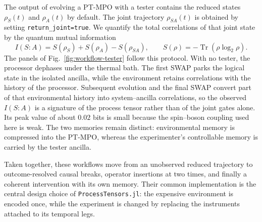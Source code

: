 The output of evolving a PT-MPO with a tester contains the reduced states $\rho_S(t)$ and $\rho_A(t)$ by default. 
The joint trajectory $\rho_{SA}(t)$ is obtained by setting \texttt{return\_joint=true}. 
We quantify the total correlations of that joint state by the quantum mutual information
%
\begin{equation}
    I(S{:}A)
    =S(\rho_S)+S(\rho_A)-S(\rho_{SA}),
    \qquad
    S(\rho)=-\operatorname{Tr}\!\left(\rho\log_2\rho\right).
    \label{eq:tester-mutual-information}
\end{equation}
%
The panels of Fig.~\ref{fig:workflow-tester} follow this protocol. 
With no tester, the processor dephases under the thermal bath. 
The first SWAP parks the logical state in the isolated ancilla, while the environment retains correlations with the history of the processor. 
Subsequent evolution and the final SWAP convert part of that environmental history into system--ancilla correlations, so the observed $I(S{:}A)$ is a signature of the process tensor rather than of the joint gates alone. 
Its peak value of about $0.02$ bits is small because the spin--boson coupling used here is weak. 
The two memories remain distinct: environmental memory is compressed into the PT-MPO, whereas the experimenter's controllable memory is carried by the tester ancilla.

Taken together, these workflows move from an unobserved reduced trajectory to outcome-resolved causal breaks, operator insertions at two times, and finally a coherent intervention with its own memory.  
Their common implementation is the central design choice of \texttt{ProcessTensors.jl}: the expensive environment is encoded once, while the experiment is changed by replacing the instruments attached to its temporal legs.
